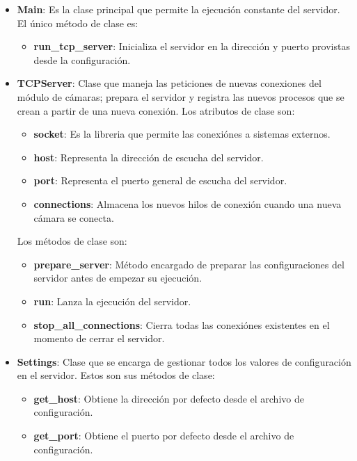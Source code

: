 \begin{itemize}
    
    \item \textbf{Main}: Es la clase principal que permite la ejecución constante del servidor. El único método de clase es:
        \begin{itemize}
            \item \textbf{run\_tcp\_server}: Inicializa el servidor en la dirección y puerto provistas desde la configuración.
        \end{itemize}
    \item \textbf{TCPServer}: Clase que maneja las peticiones de nuevas conexiones del módulo de cámaras; prepara el servidor y registra las nuevos procesos que se crean a partir de una nueva conexión. Los atributos de clase son:
        \begin{itemize}
            \item \textbf{socket}: Es la libreria que permite las conexiónes a sistemas externos.
            \item \textbf{host}: Representa la dirección de escucha del servidor.
            \item \textbf{port}: Representa el puerto general de escucha del servidor.
            \item \textbf{connections}: Almacena los nuevos hilos de conexión cuando una nueva cámara se conecta.
        \end{itemize}
        Los métodos de clase son:
        \begin{itemize}
            \item \textbf{prepare\_server}: Método encargado de preparar las configuraciones del servidor antes de empezar su ejecución.
            \item \textbf{run}: Lanza la ejecución del servidor.
            \item \textbf{stop\_all\_connections}: Cierra todas las conexiónes existentes en el momento de cerrar el servidor.
        \end{itemize}
    \item \textbf{Settings}: Clase que se encarga de gestionar todos los valores de configuración en el servidor. Estos son sus métodos de clase:
        \begin{itemize}
            \item \textbf{get\_host}: Obtiene la dirección por defecto desde el archivo de configuración.
            \item \textbf{get\_port}: Obtiene el puerto por defecto desde el archivo de configuración.

\end{itemize}
\end{itemize}
